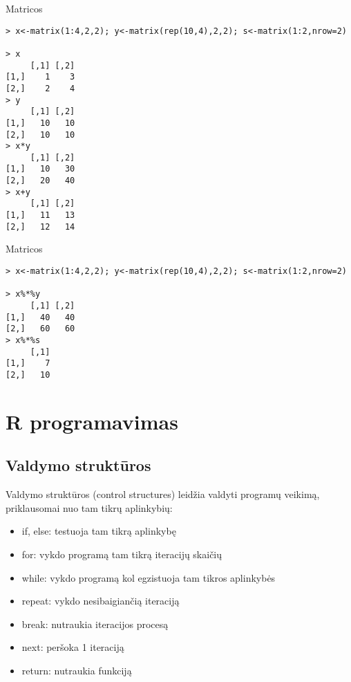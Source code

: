 \documentclass[11pt,xcolor=table]{beamer}
\begin{document}

\begin{frame}[fragile]{Matricos}
\begin{lstlisting}
> x<-matrix(1:4,2,2); y<-matrix(rep(10,4),2,2); s<-matrix(1:2,nrow=2)

> x
     [,1] [,2]
[1,]    1    3
[2,]    2    4
> y
     [,1] [,2]
[1,]   10   10
[2,]   10   10
> x*y
     [,1] [,2]
[1,]   10   30
[2,]   20   40
> x+y
     [,1] [,2]
[1,]   11   13
[2,]   12   14
\end{lstlisting}
\end{frame}

\begin{frame}[fragile]{Matricos}
\begin{lstlisting}
> x<-matrix(1:4,2,2); y<-matrix(rep(10,4),2,2); s<-matrix(1:2,nrow=2)

> x%*%y
     [,1] [,2]
[1,]   40   40
[2,]   60   60
> x%*%s
     [,1]
[1,]    7
[2,]   10
\end{lstlisting}
\end{frame}


\section{R programavimas}
\subsection{Valdymo struktūros}
\begin{frame}
Valdymo struktūros (control structures) leidžia valdyti programų veikimą, priklausomai nuo tam tikrų aplinkybių:
\begin{itemize}
\item if, else: testuoja tam tikrą aplinkybę
\item for: vykdo programą tam tikrą iteracijų skaičių
\item while: vykdo programą kol egzistuoja tam tikros aplinkybės
\item repeat: vykdo nesibaigiančią iteraciją
\item break: nutraukia iteracijos procesą
\item next: peršoka 1 iteraciją
\item return: nutraukia funkciją
\end{itemize}
\end{frame}
\end{document}
